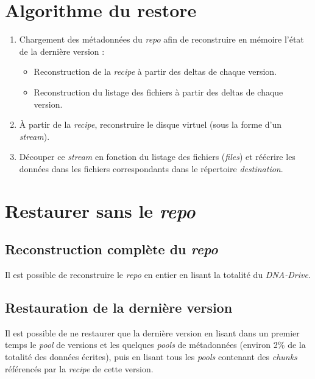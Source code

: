 \documentclass[a4paper]{report}
\begin{document}
\section{Algorithme du restore}

\begin{enumerate}
\item
  Chargement des métadonnées du \emph{repo} afin de reconstruire en
  mémoire l'état de la dernière version :

  \begin{itemize}
  \item
    Reconstruction de la \emph{recipe} à partir des deltas de chaque
    version.
  \item
    Reconstruction du listage des fichiers à partir des deltas de chaque
    version.
  \end{itemize}
\item
  À partir de la \emph{recipe}, reconstruire le disque virtuel (sous la
  forme d'un \emph{stream}).
\item
  Découper ce \emph{stream} en fonction du listage des fichiers
  (\emph{files}) et réécrire les données dans les fichiers
  correspondants dans le répertoire \emph{destination}.
\end{enumerate}

\section{\texorpdfstring{Restaurer sans le
\emph{repo}}{Restaurer sans le repo}}

\subsection{\texorpdfstring{Reconstruction complète du
\emph{repo}}{Reconstruction complète du repo}}

Il est possible de reconstruire le \emph{repo} en entier en lisant la
totalité du \emph{DNA-Drive}.

\subsection{Restauration de la dernière
version}

Il est possible de ne restaurer que la dernière version en lisant dans
un premier temps le \emph{pool} de versions et les quelques \emph{pools}
de métadonnées (environ 2\% de la totalité des données écrites), puis en
lisant tous les \emph{pools} contenant des \emph{chunks} référencés par
la \emph{recipe} de cette version.
\end{document}
